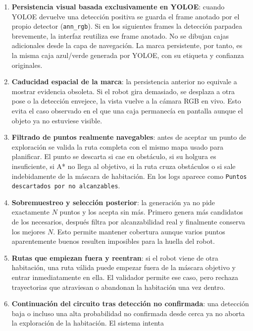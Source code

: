 \documentclass[11pt,a4paper]{article}
\begin{document}
\begin{enumerate}
  \item \textbf{Persistencia visual basada exclusivamente en YOLOE}: cuando
        YOLOE devuelve una detección positiva se guarda el frame anotado por el
        propio detector (\texttt{ann\_rgb}). Si en los siguientes frames la
        detección parpadea brevemente, la interfaz reutiliza ese frame anotado.
        No se dibujan cajas adicionales desde la capa de navegación. La marca
        persistente, por tanto, es la misma caja azul/verde generada por YOLOE,
        con su etiqueta y confianza originales.
  \item \textbf{Caducidad espacial de la marca}: la persistencia anterior no
        equivale a mostrar evidencia obsoleta. Si el robot gira demasiado, se
        desplaza a otra pose o la detección envejece, la vista vuelve a la
        cámara RGB en vivo. Esto evita el caso observado en el que una caja
        permanecía en pantalla aunque el objeto ya no estuviese visible.
  \item \textbf{Filtrado de puntos realmente navegables}: antes de aceptar un
        punto de exploración se valida la ruta completa con el mismo mapa usado
        para planificar. El punto se descarta si cae en obstáculo, si su
        holgura es insuficiente, si A* no llega al objetivo, si la ruta cruza
        obstáculos o si sale indebidamente de la máscara de habitación. En los
        logs aparece como \texttt{Puntos descartados por no alcanzables}.
  \item \textbf{Sobremuestreo y selección posterior}: la generación ya no pide
        exactamente $N$ puntos y los acepta sin más. Primero genera más
        candidatos de los necesarios, después filtra por alcanzabilidad real y
        finalmente conserva los mejores $N$. Esto permite mantener cobertura
        aunque varios puntos aparentemente buenos resulten imposibles para la
        huella del robot.
  \item \textbf{Rutas que empiezan fuera y reentran}: si el robot viene de otra
        habitación, una ruta válida puede empezar fuera de la máscara objetivo
        y entrar inmediatamente en ella. El validador permite ese caso, pero
        rechaza trayectorias que atraviesan o abandonan la habitación una vez
        dentro.
  \item \textbf{Continuación del circuito tras detección no confirmada}: una
        detección baja o incluso una alta probabilidad no confirmada desde
        cerca ya no aborta la exploración de la habitación. El sistema intenta

\end{enumerate}
\end{document}
